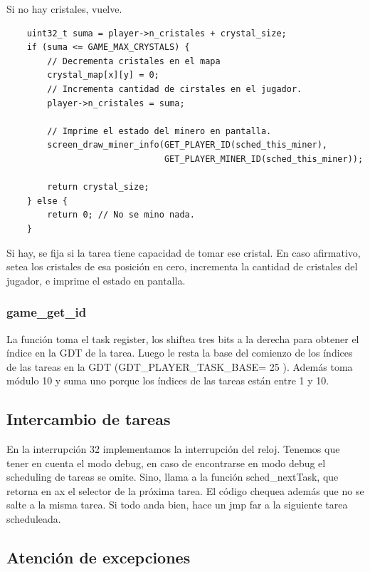 \documentclass[a4paper]{article}
\newenvironment{codesnippet}{%
	\begin{Sbox}\begin{minipage}{\textwidth}\sffamily\small}%
	{\end{minipage}\end{Sbox}%
		\begin{center}%
		\vspace{-0.4cm}\colorbox{litegrey}{\TheSbox}\end{center}\vspace{0.3cm}}
\begin{document}
Si no hay cristales, vuelve.

\begin{codesnippet}
  \begin{verbatim}
    uint32_t suma = player->n_cristales + crystal_size; 
    if (suma <= GAME_MAX_CRYSTALS) {
        // Decrementa cristales en el mapa
        crystal_map[x][y] = 0;
        // Incrementa cantidad de cirstales en el jugador.
        player->n_cristales = suma;

        // Imprime el estado del minero en pantalla.
        screen_draw_miner_info(GET_PLAYER_ID(sched_this_miner),
                               GET_PLAYER_MINER_ID(sched_this_miner));

        return crystal_size;
    } else {
        return 0; // No se mino nada.
    }
     \end{verbatim}
\end{codesnippet}

Si hay, se fija si la tarea tiene capacidad de tomar ese cristal. En caso afirmativo, setea los cristales de esa
posición en cero, incrementa la cantidad de cristales del jugador, e imprime el estado en pantalla.

\subsubsection{game_get_id}

La función toma el task register, los shiftea tres bits a la derecha para obtener el índice en la GDT de la tarea. Luego
le resta la base del comienzo de los índices de las tareas en la GDT (GDT_PLAYER_TASK_BASE= 25 ). Además toma módulo 10
y suma uno porque los índices de las tareas están entre 1 y 10.


\subsection{Intercambio de tareas}

En la interrupción 32 implementamos la interrupción del reloj. Tenemos que tener en cuenta el modo debug, en caso de
encontrarse en modo debug el scheduling de tareas se omite. Sino, llama a la función sched_nextTask, que retorna en ax
el selector de la próxima tarea. El código chequea además que no se salte a la misma tarea. Si todo anda bien, hace un
jmp far a la siguiente tarea scheduleada.

\subsection{Atención de excepciones}
\end{document}

